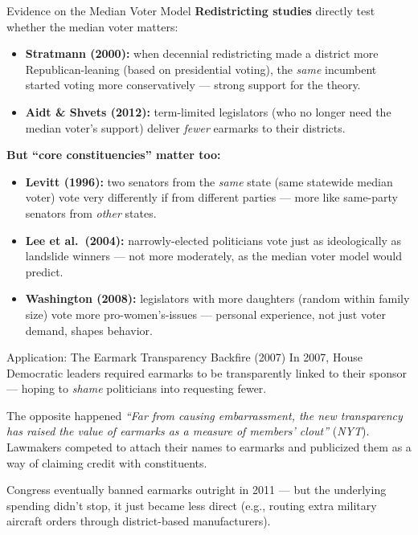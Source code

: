 \documentclass[11pt,aspectratio=169]{beamer}
\begin{document}
\begin{frame}{Evidence on the Median Voter Model}
  \footnotesize
  \textbf{Redistricting studies} directly test whether the median voter matters:
  \begin{itemize}
    \setlength{\itemsep}{1pt}
    \item \textbf{Stratmann (2000):} when decennial redistricting made a district more Republican-leaning (based on presidential voting), the \emph{same} incumbent started voting more conservatively --- strong support for the theory.
    \item \textbf{Aidt \& Shvets (2012):} term-limited legislators (who no longer need the median voter's support) deliver \emph{fewer} earmarks to their districts.
  \end{itemize}
  \vspace{0.2em}
  \textbf{But ``core constituencies'' matter too:}
  \begin{itemize}
    \setlength{\itemsep}{1pt}
    \item \textbf{Levitt (1996):} two senators from the \emph{same} state (same statewide median voter) vote very differently if from different parties --- more like same-party senators from \emph{other} states.
    \item \textbf{Lee et al.\ (2004):} narrowly-elected politicians vote just as ideologically as landslide winners --- not more moderately, as the median voter model would predict.
    \item \textbf{Washington (2008):} legislators with more daughters (random within family size) vote more pro-women's-issues --- personal experience, not just voter demand, shapes behavior.
  \end{itemize}
\end{frame}

\begin{frame}{Application: The Earmark Transparency Backfire (2007)}
  In 2007, House Democratic leaders required earmarks to be transparently linked to their sponsor --- hoping to \emph{shame} politicians into requesting fewer.
  \begin{alertblock}{The opposite happened}
    \emph{``Far from causing embarrassment, the new transparency has raised the value of earmarks as a measure of members' clout''} (\emph{NYT}). Lawmakers competed to attach their names to earmarks and publicized them as a way of claiming credit with constituents.
  \end{alertblock}
  \small Congress eventually banned earmarks outright in 2011 --- but the underlying spending didn't stop, it just became less direct (e.g., routing extra military aircraft orders through district-based manufacturers).
\end{frame}
\end{document}
